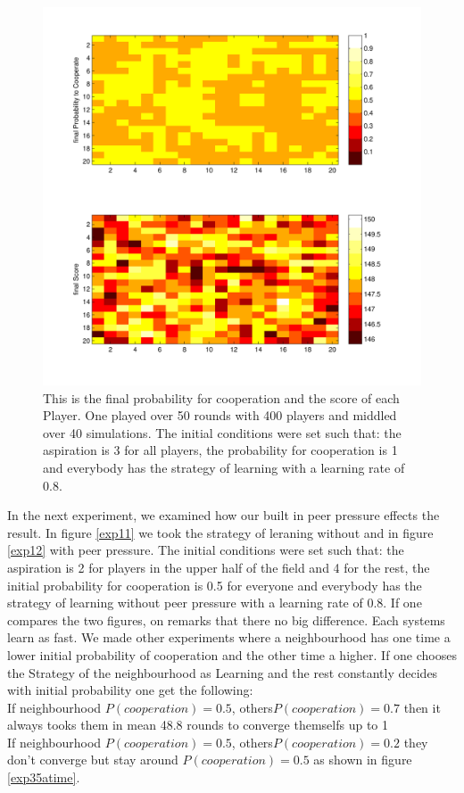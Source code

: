 \documentclass[11pt]{article}
\begin{document}
\begin{figure}
\centering
\includegraphics[scale=0.6]{ScoreAndProbcoopWithImagesc_0_1_31.pdf}
\caption[]{This is the final probability for cooperation and the score of each Player. One played over 50 rounds with 400 players and middled over 40 simulations. The initial conditions were set such that: the aspiration is 3 for all players, the probability for cooperation is 1 and everybody has the strategy of learning with a learning rate of 0.8.}
\label{exp31}
\end{figure}


In the next experiment, we examined how our built in peer pressure effects the result. In figure \ref{exp11} we took the strategy of leraning without and in figure \ref{exp12} with peer pressure. The initial conditions were set such that: the aspiration is 2 for players in the upper half of the field and 4 for the rest, the initial probability for cooperation is 0.5 for everyone and everybody has the strategy of learning without peer pressure with a learning rate of 0.8. If one compares the two figures, on remarks that there no big difference. Each systems learn as fast. We made other experiments where a neighbourhood has one time a lower initial probability of cooperation and the other time a higher. If one chooses the Strategy of the neighbourhood as Learning and the rest constantly decides with initial probability one get the following:
\\If neighbourhood $P(cooperation)=0.5$, others$P(cooperation)=0.7$ then it always tooks them in mean 48.8 rounds to converge themselfs up to 1%
\\If neighbourhood $P(cooperation)=0.5$, others$P(cooperation)=0.2$ they don't converge but stay around $P(cooperation)=0.5$ as shown in figure \ref{exp35atime}.
\end{document}
